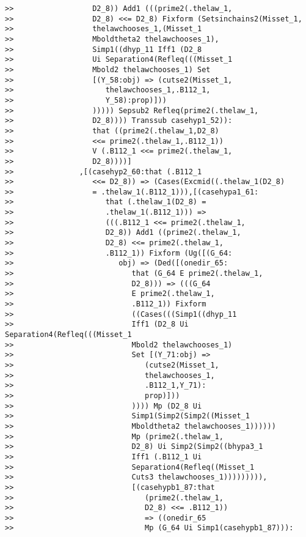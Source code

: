 \documentclass[12pt]{article}
\begin{document}
\begin{verbatim}
>>                  D2_8)) Add1 (((prime2(.thelaw_1,
>>                  D2_8) <<= D2_8) Fixform (Setsinchains2(Misset_1,
>>                  thelawchooses_1,(Misset_1
>>                  Mboldtheta2 thelawchooses_1),
>>                  Simp1((dhyp_11 Iff1 (D2_8
>>                  Ui Separation4(Refleq(((Misset_1
>>                  Mbold2 thelawchooses_1) Set
>>                  [(Y_58:obj) => (cutse2(Misset_1,
>>                     thelawchooses_1,.B112_1,
>>                     Y_58):prop)]))
>>                  ))))) Sepsub2 Refleq(prime2(.thelaw_1,
>>                  D2_8)))) Transsub casehyp1_52)):
>>                  that ((prime2(.thelaw_1,D2_8)
>>                  <<= prime2(.thelaw_1,.B112_1))
>>                  V (.B112_1 <<= prime2(.thelaw_1,
>>                  D2_8))))]
>>               ,[(casehyp2_60:that (.B112_1
>>                  <<= D2_8)) => (Cases(Excmid((.thelaw_1(D2_8)
>>                  = .thelaw_1(.B112_1))),[(casehypa1_61:
>>                     that (.thelaw_1(D2_8) =
>>                     .thelaw_1(.B112_1))) =>
>>                     (((.B112_1 <<= prime2(.thelaw_1,
>>                     D2_8)) Add1 ((prime2(.thelaw_1,
>>                     D2_8) <<= prime2(.thelaw_1,
>>                     .B112_1)) Fixform (Ug([(G_64:
>>                        obj) => (Ded([(onedir_65:
>>                           that (G_64 E prime2(.thelaw_1,
>>                           D2_8))) => (((G_64
>>                           E prime2(.thelaw_1,
>>                           .B112_1)) Fixform
>>                           ((Cases(((Simp1((dhyp_11
>>                           Iff1 (D2_8 Ui Separation4(Refleq(((Misset_1
>>                           Mbold2 thelawchooses_1)
>>                           Set [(Y_71:obj) =>
>>                              (cutse2(Misset_1,
>>                              thelawchooses_1,
>>                              .B112_1,Y_71):
>>                              prop)]))
>>                           )))) Mp (D2_8 Ui
>>                           Simp1(Simp2(Simp2((Misset_1
>>                           Mboldtheta2 thelawchooses_1))))))
>>                           Mp (prime2(.thelaw_1,
>>                           D2_8) Ui Simp2(Simp2((bhypa3_1
>>                           Iff1 (.B112_1 Ui
>>                           Separation4(Refleq((Misset_1
>>                           Cuts3 thelawchooses_1))))))))),
>>                           [(casehypb1_87:that
>>                              (prime2(.thelaw_1,
>>                              D2_8) <<= .B112_1))
>>                              => ((onedir_65
>>                              Mp (G_64 Ui Simp1(casehypb1_87))):

\end{verbatim}
\end{document}
